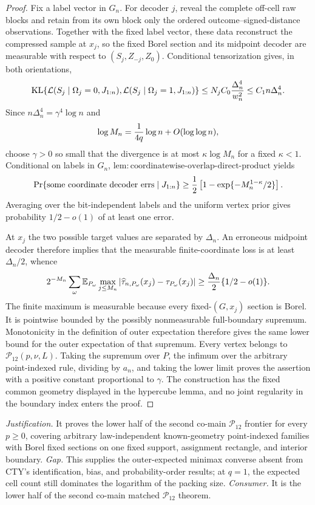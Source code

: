 \documentclass{article}
\begin{document}
\begin{proof}
Fix a label vector in \(G_n\).  For decoder \(j\), reveal the complete off-cell raw blocks and retain from its own block only the ordered outcome--signed-distance observations.  Together with the fixed label vector, these data reconstruct the compressed sample at \(x_j\), so the fixed Borel section and its midpoint decoder are measurable with respect to \((S_j,Z_{-j},Z_0)\).  Conditional tensorization gives, in both orientations,
\[
 \operatorname{KL}\{\mathcal L(S_j\mid\Omega_j=0,J_{1:n}),
 \mathcal L(S_j\mid\Omega_j=1,J_{1:n})\}
 \leq N_jC_0{\Delta_n^4\over w_n^2}
 \leq C_1n\Delta_n^4.
\]
Since \(n\Delta_n^4=\gamma^4\log n\) and
\[
 \log M_n={1\over4q}\log n+O(\log\log n),
\]
choose \(\gamma>0\) so small that the divergence is at most \(\kappa\log M_n\) for a fixed \(\kappa<1\).  Conditional on labels in \(G_n\), \(\mathrm{lem:coordinatewise\text{-}overlap\text{-}direct\text{-}product}\) yields
\[
 \Pr\{\text{some coordinate decoder errs}\mid J_{1:n}\}
 \geq {1\over2}\left[1-\exp\{-M_n^{1-\kappa}/2\}\right].
\]
Averaging over the bit-independent labels and the uniform vertex prior gives probability \(1/2-o(1)\) of at least one error.

At \(x_j\) the two possible target values are separated by \(\Delta_n\).  An erroneous midpoint decoder therefore implies that the measurable finite-coordinate loss is at least \(\Delta_n/2\), whence
\[
 2^{-M_n}\sum_\omega
 \mathbb E_{P_\omega}\max_{j\leq M_n}
 |\widehat\tau_{n,P_\omega}(x_j)-\tau_{P_\omega}(x_j)|
 \geq {\Delta_n\over2}\{1/2-o(1)\}.
\]
The finite maximum is measurable because every fixed-\((G,x_j)\) section is Borel.  It is pointwise bounded by the possibly nonmeasurable full-boundary supremum.  Monotonicity in the definition of outer expectation therefore gives the same lower bound for the outer expectation of that supremum.  Every vertex belongs to \(\mathcal P_{12}(p,\nu,L)\).  Taking the supremum over \(P\), the infimum over the arbitrary point-indexed rule, dividing by \(a_n\), and taking the lower limit proves the assertion with a positive constant proportional to \(\gamma\).  The construction has the fixed common geometry displayed in the hypercube lemma, and no joint regularity in the boundary index enters the proof.
\end{proof}
\par\smallskip\noindent \textit{Justification.} It proves the lower half of the second co-main \(\mathcal P_{12}\) frontier for every \(p\geq0\), covering arbitrary law-independent known-geometry point-indexed families with Borel fixed sections on one fixed support, assignment rectangle, and interior boundary. \textit{Gap.} This supplies the outer-expected minimax converse absent from CTY's identification, bias, and probability-order results; at \(q=1\), the expected cell count still dominates the logarithm of the packing size. \textit{Consumer.} It is the lower half of the second co-main matched \(\mathcal P_{12}\) theorem.
\end{document}
